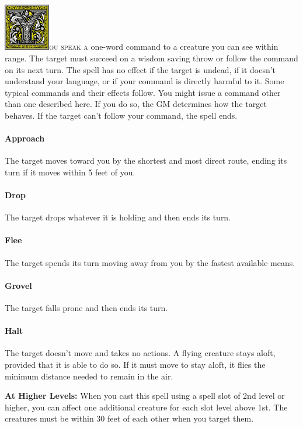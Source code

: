 \documentclass[12pt,showtrims]{memoir}
\begin{document}
\vspace{1\baselineskip}\noindent 
\lettrine[lines=4]{\includegraphics[height=58pt]{initials/Y.png}}{ou speak a} one-word command to a creature you can see within range. The target must succeed on a wisdom saving throw or follow the command on its next turn. The spell has no effect if the target is undead, if it doesn't understand your language, or if your command is directly harmful to it. Some typical commands and their effects follow. You might issue a command other than one described here. If you do so, the GM determines how the target behaves. If the target can't follow your command, the spell ends. \paragraph{Approach} The target moves toward you by the shortest and most direct route, ending its turn if it moves within 5 feet of you. \paragraph{Drop} The target drops whatever it is holding and then ends its turn. \paragraph{Flee} The target spends its turn moving away from you by the fastest available means. \paragraph{Grovel} The target falls prone and then ends its turn. \paragraph{Halt} The target doesn't move and takes no actions. A flying creature stays aloft, provided that it is able to do so. If it must move to stay aloft, it flies the minimum distance needed to remain in the air.

\vspace{8pt} \noindent\textbf{At Higher Levels:} When you cast this spell using a spell slot of 2nd level or higher, you can affect one additional creature for each slot level above 1st. The creatures must be within 30 feet of each other when you target them.
\end{document}
